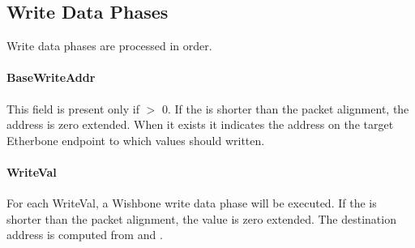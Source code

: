 \documentclass{article}
\begin{document}
\subsection{Write Data Phases}

Write data phases are processed in order.

\paragraph{BaseWriteAddr} \label{field:BaseWriteAddr}
This field is present only if  $>$ 0.
If the  is shorter than the packet alignment, 
the address is zero extended.
When it exists it indicates the address on the target Etherbone endpoint 
to which values should written.

\paragraph{WriteVal} \label{field:WriteVal}
For each WriteVal, 
a Wishbone write data phase will be executed.
If the  is shorter than the packet alignment, 
the value is zero extended.
The destination address is computed from  and 
.
\end{document}
